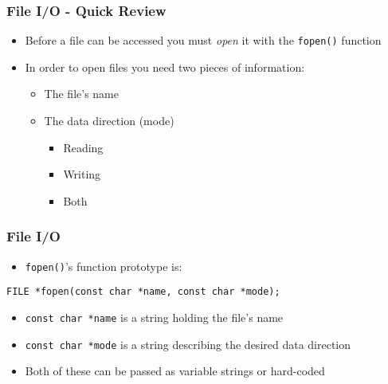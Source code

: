 \documentclass[14pt]{beamer}
\begin{document}
\begin{frame}[fragile]
\frametitle{File I/O - Quick Review}
\begin{itemize}
\item Before a file can be accessed you must \textit{open} it with the \texttt{fopen()} function
\item In order to open files you need two pieces of information:
	\begin{itemize}
		\item The file's name
		\item The data direction (mode)
			\begin{itemize}
				\item Reading
				\item Writing
				\item Both
			\end{itemize}
	\end{itemize}
\end{itemize}
\end{frame}

\begin{frame}[fragile]
\frametitle{File I/O}
\begin{itemize}
\item \texttt{fopen()}'s function prototype is:
\end{itemize}
\begin{lstlisting}[style=CStyle]
FILE *fopen(const char *name, const char *mode);
\end{lstlisting}
\begin{itemize}
\item \texttt{const char *name} is a string holding the file's name
\item \texttt{const char *mode} is a string describing the desired data direction
\item Both of these can be passed as variable strings or hard-coded
\end{itemize}
\end{frame}
\end{document}
